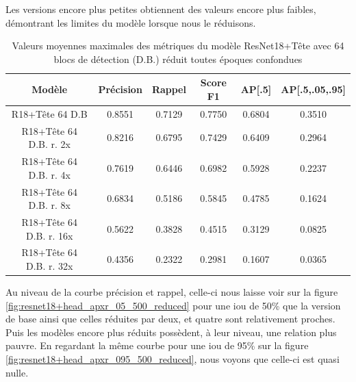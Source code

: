 Les versions encore plus petites obtiennent des valeurs encore plus faibles, démontrant les limites du modèle lorsque nous le réduisons.

\begin{table}[!ht]
    \caption{Valeurs moyennes maximales des métriques du modèle ResNet18+Tête avec 64 blocs de détection (D.B.) réduit toutes époques confondues}
    \label{tab:max_values_for_each_metric_resnet18+head_reduced_models}
    \centering
    \begin{tabular}{ |c||c|c|c|c|c|  }
        \hline
        \rowcolor{gray!50}
        Modèle & Précision & Rappel & Score F1 & AP[.5] & AP[.5,.05,.95]\\
        \hline
        R18+Tête 64 D.B & 0.8551 & 0.7129 & 0.7750 & 0.6804 & 0.3510\\
        R18+Tête 64 D.B. r. 2x & 0.8216 & 0.6795 & 0.7429 & 0.6409 & 0.2964\\
        R18+Tête 64 D.B. r. 4x & 0.7619 & 0.6446 & 0.6982 & 0.5928 & 0.2237\\
        R18+Tête 64 D.B. r. 8x & 0.6834 & 0.5186 & 0.5845 & 0.4785 & 0.1624\\
        R18+Tête 64 D.B. r. 16x & 0.5622 & 0.3828 & 0.4515 & 0.3129 & 0.0825\\
        R18+Tête 64 D.B. r. 32x & 0.4356 & 0.2322 & 0.2981 & 0.1607  & 0.0365\\
        \hline
    \end{tabular}
\end{table}

Au niveau de la courbe précision et rappel, celle-ci nous laisse voir sur la figure \ref{fig:resnet18+head_apxr_05_500_reduced} pour une \acrshort{iou} de 50\% que la version de base ainsi que celles réduites par deux, et quatre sont relativement proches. Puis les modèles encore plus réduits possèdent, à leur niveau, une relation plus pauvre. En regardant la même courbe pour une \acrshort{iou} de 95\% sur la figure \ref{fig:resnet18+head_apxr_095_500_reduced}, nous voyons que celle-ci est quasi nulle.

